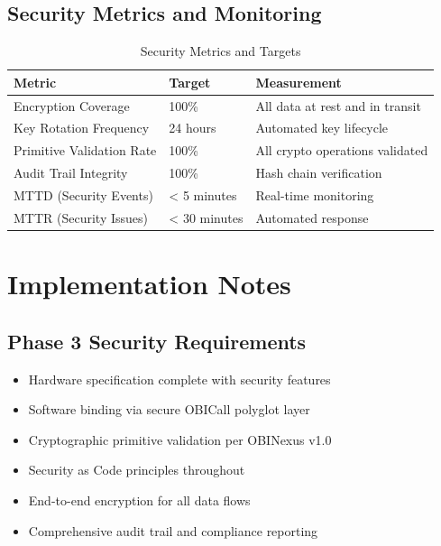 \documentclass[12pt,a4paper]{article}
\begin{document}
\subsection{Security Metrics and Monitoring}

\begin{table}[h]
\centering
\begin{tabular}{|l|l|l|}
\hline
\textbf{Metric} & \textbf{Target} & \textbf{Measurement} \\
\hline
Encryption Coverage & 100\% & All data at rest and in transit \\
\hline
Key Rotation Frequency & 24 hours & Automated key lifecycle \\
\hline
Primitive Validation Rate & 100\% & All crypto operations validated \\
\hline
Audit Trail Integrity & 100\% & Hash chain verification \\
\hline
MTTD (Security Events) & < 5 minutes & Real-time monitoring \\
\hline
MTTR (Security Issues) & < 30 minutes & Automated response \\
\hline
\end{tabular}
\caption{Security Metrics and Targets}
\end{table}

\section{Implementation Notes}

\subsection{Phase 3 Security Requirements}
\begin{itemize}
    \item Hardware specification complete with security features
    \item Software binding via secure OBICall polyglot layer
    \item Cryptographic primitive validation per OBINexus v1.0
    \item Security as Code principles throughout
    \item End-to-end encryption for all data flows
    \item Comprehensive audit trail and compliance reporting
\end{itemize}
\end{document}
